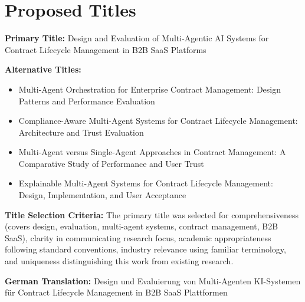 
\section{Proposed Titles}\label{section:proposed_titles}

\textbf{Primary Title:} Design and Evaluation of Multi-Agentic AI Systems for Contract Lifecycle Management in B2B SaaS Platforms

\textbf{Alternative Titles:}
\begin{itemize}
    \item Multi-Agent Orchestration for Enterprise Contract Management: Design Patterns and Performance Evaluation
    \item Compliance-Aware Multi-Agent Systems for Contract Lifecycle Management: Architecture and Trust Evaluation
    \item Multi-Agent versus Single-Agent Approaches in Contract Management: A Comparative Study of Performance and User Trust
    \item Explainable Multi-Agent Systems for Contract Lifecycle Management: Design, Implementation, and User Acceptance
\end{itemize}

\textbf{Title Selection Criteria:} The primary title was selected for comprehensiveness (covers design, evaluation, multi-agent systems, contract management, B2B SaaS), clarity in communicating research focus, academic appropriateness following standard conventions, industry relevance using familiar terminology, and uniqueness distinguishing this work from existing research.

\textbf{German Translation:} Design und Evaluierung von Multi-Agenten KI-Systemen für Contract Lifecycle Management in B2B SaaS Plattformen
